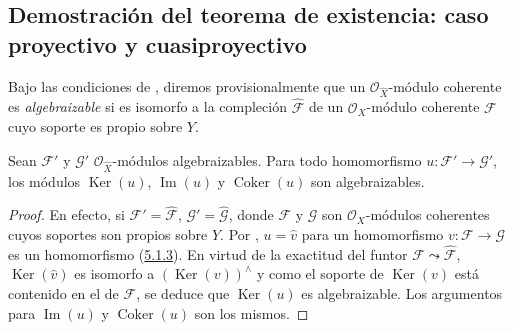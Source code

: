 \subsection{Demostración del teorema de existencia: caso proyectivo y cuasiproyectivo}
\label{subsection:III.5.2}
\label{subsection:III.5.2-fr}

\begin{env}[5.2.1]
\label{III.5.2.1}
\label{III.5.2.1-fr}
Bajo las condiciones de , diremos
provisionalmente que un $\mathcal O_{\widehat X}$-módulo coherente es
\emph{algebraizable} si es isomorfo a la compleción
$\widehat{\mathcal F}$ de un $\mathcal O_X$-módulo coherente $\mathcal F$ cuyo
soporte es propio sobre $Y$.
\end{env}

\begin{lemma}[5.2.2]
\label{III.5.2.2}
\label{III.5.2.2-fr}
Sean $\mathcal F'$ y $\mathcal G'$ $\mathcal O_{\widehat X}$-módulos
algebraizables. Para todo homomorfismo
$u:\mathcal F'\to\mathcal G'$, los módulos
$\operatorname{Ker}(u)$, $\operatorname{Im}(u)$ y $\operatorname{Coker}(u)$ son
algebraizables.
\end{lemma}

\begin{proof}
En efecto, si $\mathcal F'=\widehat{\mathcal F}$,
$\mathcal G'=\widehat{\mathcal G}$, donde $\mathcal F$ y $\mathcal G$ son $\mathcal O_X$-módulos coherentes cuyos
soportes son propios sobre $Y$. Por ,
$u=\widehat v$ para un homomorfismo
$v:\mathcal F\to\mathcal G$ es un homomorfismo
(\hyperref[III.5.1.3-fr]{5.1.3}). En virtud de la exactitud del funtor
$\mathcal F\leadsto\widehat{\mathcal F}$,
$\operatorname{Ker}(\widehat v)$ es isomorfo a
$(\operatorname{Ker}(v))^{\wedge}$ y como el soporte de
$\operatorname{Ker}(v)$ está contenido en el de $\mathcal F$, se deduce que
$\operatorname{Ker}(u)$ es algebraizable. Los argumentos para $\operatorname{Im}(u)$ y
$\operatorname{Coker}(u)$ son los mismos.
\end{proof}

